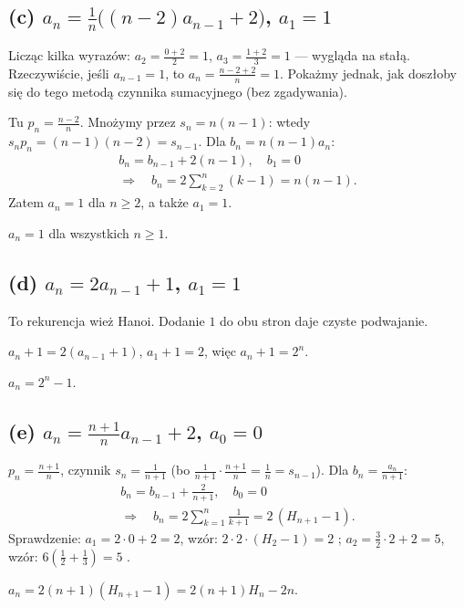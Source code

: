 \documentclass[11pt]{article}
\begin{document}
\subsection*{(c) $a_n=\frac1n\bigl((n-2)a_{n-1}+2\bigr)$, $a_1=1$}
\begin{intuicja}
Licząc kilka wyrazów: $a_2=\frac{0+2}{2}=1$, $a_3=\frac{1+2}{3}=1$ --- wygląda na
stałą. Rzeczywiście, jeśli $a_{n-1}=1$, to $a_n=\frac{n-2+2}{n}=1$. Pokażmy
jednak, jak doszłoby się do tego metodą czynnika sumacyjnego (bez zgadywania).
\end{intuicja}
\formalnie
Tu $p_n=\frac{n-2}{n}$. Mnożymy przez $s_n=n(n-1)$: wtedy $s_np_n=(n-1)(n-2)=s_{n-1}$.
Dla $b_n=n(n-1)a_n$:
\begin{gather*}
b_n = b_{n-1} + 2(n-1),\quad b_1=0\\
\Longrightarrow\quad b_n=2\sum_{k=2}^n(k-1)=n(n-1).
\end{gather*}
Zatem $a_n = 1$ dla $n\ge2$, a także $a_1=1$.
\begin{odpowiedz}$a_n=1$ dla wszystkich $n\ge1$.\end{odpowiedz}

\subsection*{(d) $a_n=2a_{n-1}+1$, $a_1=1$}
\begin{intuicja}
To rekurencja wież Hanoi. Dodanie $1$ do obu stron daje czyste podwajanie.
\end{intuicja}
\formalnie
$a_n+1 = 2(a_{n-1}+1)$, $a_1+1=2$, więc $a_n+1=2^n$.
\begin{odpowiedz}$a_n=2^n-1$.\end{odpowiedz}

\subsection*{(e) $a_n=\frac{n+1}{n}a_{n-1}+2$, $a_0=0$}
\formalnie
$p_n=\frac{n+1}{n}$, czynnik $s_n=\frac1{n+1}$ (bo $\frac{1}{n+1}\cdot\frac{n+1}{n}=\frac1n=s_{n-1}$).
Dla $b_n=\frac{a_n}{n+1}$:
\begin{gather*}
b_n=b_{n-1}+\frac{2}{n+1},\quad b_0=0\\
\Longrightarrow\quad b_n = 2\sum_{k=1}^n\frac{1}{k+1} = 2\,(H_{n+1}-1).
\end{gather*}
Sprawdzenie: $a_1=2\cdot0+2=2$, wzór: $2\cdot2\cdot(H_2-1)=2$ \checkmark; $a_2=\frac32\cdot2+2=5$, wzór: $6(\frac12+\frac13)=5$ \checkmark.
\begin{odpowiedz}$a_n = 2(n+1)(H_{n+1}-1) = 2(n+1)H_n - 2n$.\end{odpowiedz}
\end{document}
